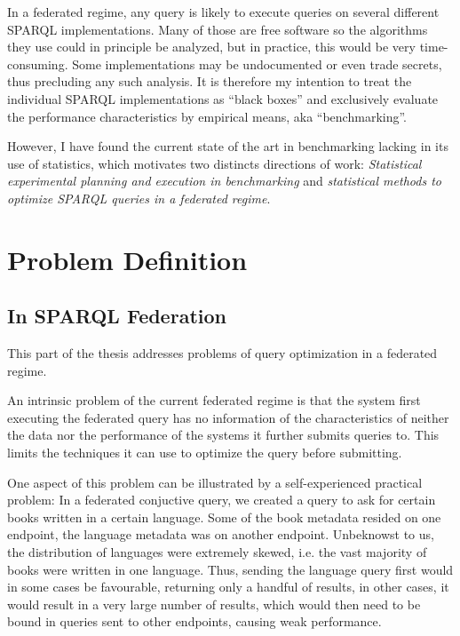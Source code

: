 \documentclass{llncs}
\begin{document}
In a federated regime, any query is likely to execute queries on
several different SPARQL implementations. Many of those are free
software so the algorithms they use could in principle be analyzed,
but in practice, this would be very time-consuming. Some
implementations may be undocumented or even trade secrets, thus
precluding any such analysis. It is therefore my intention to treat
the individual SPARQL implementations as ``black boxes'' and
exclusively evaluate the performance characteristics by empirical
means, aka ``benchmarking''.

However, I have found the current state of the art in benchmarking
lacking in its use of statistics, which motivates two distincts
directions of work: \emph{Statistical experimental planning and execution in
benchmarking} and \emph{statistical methods to optimize SPARQL queries
in a federated regime}.

\section{Problem Definition}

\subsection{In SPARQL Federation}

This part of the thesis addresses problems of query optimization in a
federated regime.

An intrinsic problem of the current federated regime is that the
system first executing the federated query has no information of the
characteristics of neither the data nor the performance of the systems
it further submits queries to. This limits the techniques it can use
to optimize the query before submitting.

One aspect of this problem can be illustrated by a self-experienced
practical problem: In a federated conjuctive query, we created a query
to ask for certain books written in a certain
language. Some of the book metadata resided on one endpoint, the
language metadata was on another endpoint. Unbeknowst to us, the
distribution of languages were extremely skewed, i.e. the vast
majority of books were written in one language. Thus, sending the
language query first would in some cases be favourable, returning only
a handful of results, in other cases, it would result in a very large
number of results, which would then need to be bound in queries sent
to other endpoints, causing weak performance.
\end{document}
